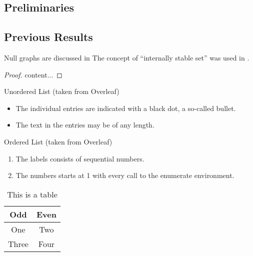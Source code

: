 \lipsum[2]

\subsection{Preliminaries}
\label{sec:pre}

\lipsum[3]

\subsection{Previous Results}
\label{sec:prev-results}

Null graphs are discussed in \cite{HararyR74}
The concept of ``internally stable set'' was used in \cite{Berge57, Berge58}.

\begin{theorem}
	\label{thrm:1}
	\lipsum[4]
\end{theorem}
\begin{proof}
	content...
\end{proof}

\begin{corollary}
\label{cor:1}

\lipsum[5]
\end{corollary}

Unordered List (taken from Overleaf)
\begin{itemize}
	\item The individual entries are indicated with a black dot, a so-called bullet.
	\item The text in the entries may be of any length.
\end{itemize}

Ordered List (taken from Overleaf)
\begin{enumerate}
	\item The labels consists of sequential numbers.
	\item The numbers starts at 1 with every call to the enumerate environment.
\end{enumerate}

\begin{table}[ht]
	\centering
	\begin{tabular}{|c|c|}
		\hline
		\textbf{Odd} & \textbf{Even} \\
		\hline\hline
		One & Two \\
		\hline
		Three & Four \\
		\hline
	\end{tabular}
	\caption{This is a table}
	\label{tbl:1}
\end{table}

